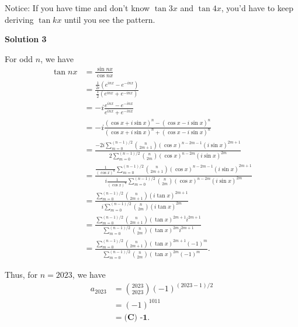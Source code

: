 \begin{enumerate}
 
Notice: If you have time and don't know $\tan{3x}$ and $\tan{4x}$, you'd have to keep deriving $\tan{kx}$ until you see the pattern.

 



\textbf{Solution 3}

For odd $n$, we have
 \begin{align*} \tan nx & = \frac{\sin nx}{\cos nx} \\ & = \frac{\frac{1}{2i} \left( e^{i n x} - e^{-i n x} \right)} {\frac{1}{2} \left( e^{i n x} + e^{-i n x} \right)} \\ & = - i \frac{e^{i n x} - e^{-i n x}}{e^{i n x} + e^{-i n x}} \\ & = - i  \frac{\left( \cos x + i \sin x \right)^n - \left( \cos x - i \sin x \right)^n} {\left( \cos x + i \sin x \right)^n + \left( \cos x - i \sin x \right)^n} \\ & = \frac{ - 2 i \sum_{m=0}^{(n-1)/2} \binom{n}{2m + 1} \left( \cos x \right)^{n - 2m - 1} \left( i \sin x \right)^{2m + 1}} {2 \sum_{m=0}^{(n-1)/2} \binom{n}{2m} \left( \cos x \right)^{n - 2m} \left( i \sin x \right)^{2m}} \\ & = \frac{ \frac{1}{\left( \cos x \right)^n} \sum_{m=0}^{(n-1)/2} \binom{n}{2m + 1} \left( \cos x \right)^{n - 2m - 1} \left( i \sin x \right)^{2m + 1}} {i \frac{1}{\left( \cos x \right)^n} \sum_{m=0}^{(n-1)/2} \binom{n}{2m} \left( \cos x \right)^{n - 2m} \left( i \sin x \right)^{2m}} \\ & = \frac{ \sum_{m=0}^{(n-1)/2} \binom{n}{2m + 1} \left( i \tan x \right)^{2m + 1}} {i \sum_{m=0}^{(n-1)/2} \binom{n}{2m} \left( i \tan x \right)^{2m}} \\ & = \frac{ \sum_{m=0}^{(n-1)/2} \binom{n}{2m + 1} \left( \tan x \right)^{2m + 1} i^{2m + 1}} {\sum_{m=0}^{(n-1)/2} \binom{n}{2m} \left( \tan x \right)^{2m} i^{2m + 1}} \\ & = \frac{ \sum_{m=0}^{(n-1)/2} \binom{n}{2m + 1} \left( \tan x \right)^{2m + 1} \left( -1 \right)^m} {\sum_{m=0}^{(n-1)/2} \binom{n}{2m} \left( \tan x \right)^{2m} \left( -1 \right)^m}  . \end{align*}


 Thus, for $n = 2023$, we have
 \begin{align*} a_{2023} & = \binom{2023}{2023} \left( -1 \right)^{(2023-1)/2} \\ & = \left( -1 \right)^{1011} \\ & = \boxed{\textbf{(C) -1}}. \end{align*}






\end{enumerate}
